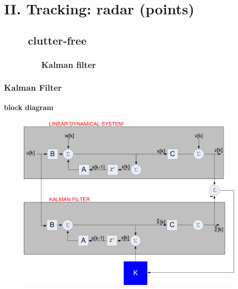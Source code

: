 \section{II. Tracking: radar (points)}


\subsection{\ \ \ \ clutter-free}
\subsubsection{\ \ \ \ \ \ \ \ Kalman filter }


\begin{frame}
\frametitle{Kalman Filter}
\framesubtitle{block diagram}
\logoCSIPCPL\mypagenum
	\begin{figure}
		\includegraphics[width=1.0\textwidth]{figs/TRK_KalmanFilter_blockDiagram.pdf}
	\end{figure}
\end{frame}



